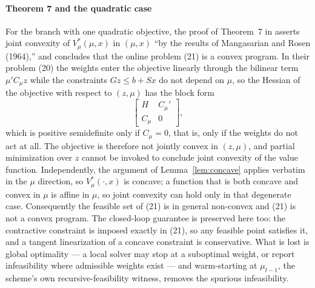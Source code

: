 \documentclass[review]{elsarticle}
\begin{document}
\paragraph{Theorem 7 and the quadratic case}
For the branch with one quadratic objective, the proof of Theorem~7 in
\citep{bemporad2009} asserts joint convexity of $V^\ast_\mu(\mu,x)$ in
$(\mu,x)$ ``by the results of Mangasarian and Rosen (1964),'' and concludes
that the online problem (21) is a convex program. In their problem (20) the
weights enter the objective linearly through the bilinear term $\mu'C_\mu z$
while the constraints $Gz\le b+Sx$ do not depend on $\mu$, so the Hessian of
the objective with respect to $(z,\mu)$ has the block form
\[
\begin{bmatrix} H & C_\mu'\\ C_\mu & 0\end{bmatrix},
\]
which is positive semidefinite only if $C_\mu=0$, that is, only if the weights
do not act at all. The objective is therefore not jointly convex in $(z,\mu)$,
and partial minimization over $z$ cannot be invoked to conclude joint
convexity of the value function. Independently, the argument of
Lemma~\ref{lem:concave} applies verbatim in the $\mu$ direction, so
$V^\ast_\mu(\cdot,x)$ is concave; a function that is both concave and convex
in $\mu$ is affine in $\mu$, so joint convexity can hold only in that
degenerate case. Consequently the feasible set of (21) is in general
non-convex and (21) is not a convex program. The closed-loop guarantee is
preserved here too: the contractive constraint is imposed exactly in (21), so
any feasible point satisfies it, and a tangent linearization of a concave
constraint is conservative. What is lost is global optimality --- a local
solver may stop at a suboptimal weight, or report infeasibility where
admissible weights exist --- and warm-starting at $\mu_{t-1}$, the scheme's
own recursive-feasibility witness, removes the spurious infeasibility.

\end{document}

